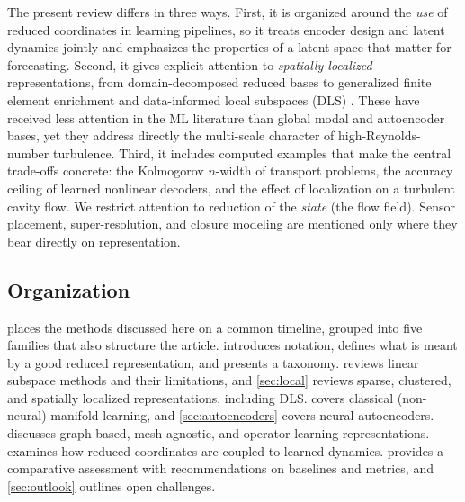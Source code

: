 The present review differs in three ways. First, it is organized around the
\emph{use} of reduced coordinates in learning pipelines, so it treats encoder
design and latent dynamics jointly and emphasizes the properties of a latent
space that matter for forecasting. Second, it gives explicit attention to
\emph{spatially localized} representations, from domain-decomposed reduced
bases to generalized finite element enrichment and data-informed local
subspaces (DLS) \parencite{deshmukh2020dls}. These have received less attention
in the ML literature than global modal and autoencoder bases, yet they address
directly the multi-scale character of high-Reynolds-number turbulence. Third,
it includes computed examples that make the central trade-offs concrete: the
Kolmogorov $n$-width of transport problems, the accuracy ceiling of learned
nonlinear decoders, and the effect of localization on a turbulent cavity flow.
We restrict attention to reduction of the \emph{state} (the flow field). Sensor
placement, super-resolution, and closure modeling are mentioned only where they
bear directly on representation.

\subsection{Organization}

 places the methods discussed here on a common timeline,
grouped into five families that also structure the article.
 introduces notation, defines what is meant by a good
reduced representation, and presents a taxonomy.
 reviews linear subspace methods and their limitations, and
\cref{sec:local} reviews sparse, clustered, and spatially localized
representations, including DLS.  covers classical
(non-neural) manifold learning, and \cref{sec:autoencoders} covers neural
autoencoders.  discusses graph-based, mesh-agnostic, and
operator-learning representations.  examines how reduced
coordinates are coupled to learned dynamics.  provides a
comparative assessment with recommendations on baselines and metrics, and
\cref{sec:outlook} outlines open challenges.


